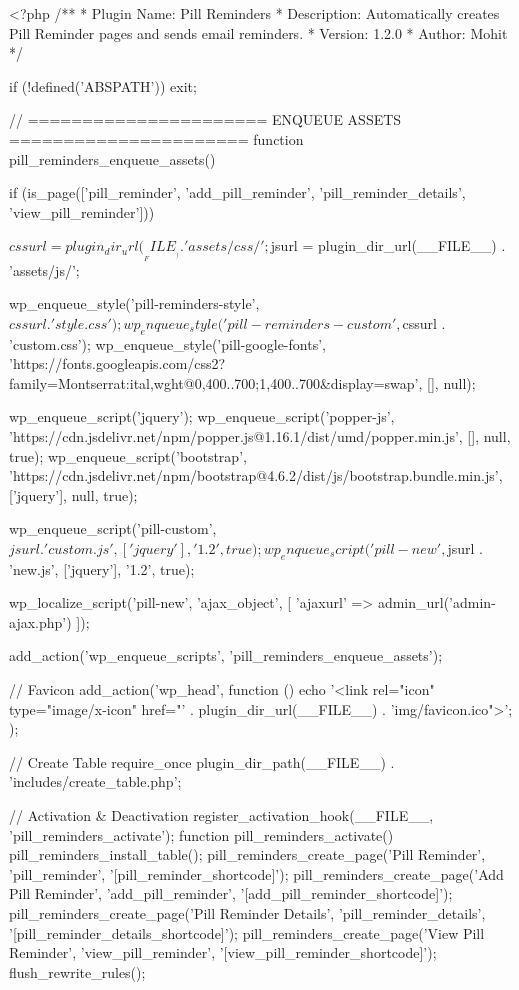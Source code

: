 <?php
/**
 * Plugin Name:       Pill Reminders
 * Description:       Automatically creates Pill Reminder pages and sends email reminders.
 * Version:           1.2.0
 * Author:            Mohit
 */

if (!defined('ABSPATH')) {
    exit;
}


// ====================== ENQUEUE ASSETS ======================
function pill_reminders_enqueue_assets()
{
    if (is_page(['pill_reminder', 'add_pill_reminder', 'pill_reminder_details', 'view_pill_reminder'])) {
        $cssurl = plugin_dir_url(__FILE__) . 'assets/css/';
        $jsurl = plugin_dir_url(__FILE__) . 'assets/js/';

        wp_enqueue_style('pill-reminders-style', $cssurl . 'style.css');
        wp_enqueue_style('pill-reminders-custom', $cssurl . 'custom.css');
        wp_enqueue_style('pill-google-fonts', 'https://fonts.googleapis.com/css2?family=Montserrat:ital,wght@0,400..700;1,400..700&display=swap', [], null);

        wp_enqueue_script('jquery');
        wp_enqueue_script('popper-js', 'https://cdn.jsdelivr.net/npm/popper.js@1.16.1/dist/umd/popper.min.js', [], null, true);
        wp_enqueue_script('bootstrap', 'https://cdn.jsdelivr.net/npm/bootstrap@4.6.2/dist/js/bootstrap.bundle.min.js', ['jquery'], null, true);

        wp_enqueue_script('pill-custom', $jsurl . 'custom.js', ['jquery'], '1.2', true);
        wp_enqueue_script('pill-new', $jsurl . 'new.js', ['jquery'], '1.2', true);

        wp_localize_script('pill-new', 'ajax_object', [
            'ajaxurl' => admin_url('admin-ajax.php')
        ]);
    }
}
add_action('wp_enqueue_scripts', 'pill_reminders_enqueue_assets');

// Favicon
add_action('wp_head', function () {
    echo '<link rel="icon" type="image/x-icon" href="' . plugin_dir_url(__FILE__) . 'img/favicon.ico">';
});

// Create Table
require_once plugin_dir_path(__FILE__) . 'includes/create_table.php';

// Activation & Deactivation
register_activation_hook(__FILE__, 'pill_reminders_activate');
function pill_reminders_activate()
{
    pill_reminders_install_table();
    pill_reminders_create_page('Pill Reminder', 'pill_reminder', '[pill_reminder_shortcode]');
    pill_reminders_create_page('Add Pill Reminder', 'add_pill_reminder', '[add_pill_reminder_shortcode]');
    pill_reminders_create_page('Pill Reminder Details', 'pill_reminder_details', '[pill_reminder_details_shortcode]');
    pill_reminders_create_page('View Pill Reminder', 'view_pill_reminder', '[view_pill_reminder_shortcode]');
    flush_rewrite_rules();
}

